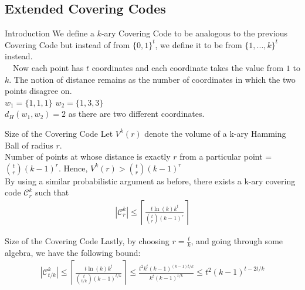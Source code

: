 \documentclass[pdf] {beamer}
\newcommand{\dist}[2]{d_H(#1,#2)}
\newcommand{\cc}{\mathcal{C}}
\begin{document}
	\subsection{Extended Covering Codes}
	\begin{frame}{Introduction}
	We define a $k$-ary Covering Code to be analogous to the previous Covering Code but instead of from $\{0,1\}^t$, we define it to be from $\{1,...,k\}^t$ instead. \\~\
	Now each point has $t$ coordinates and each coordinate takes the value from $1$ to $k$. The notion of distance remains as the number of coordinates in which the two points disagree on.\\
	$w_1 = \{1, 1, 1\}$ $w_2 = \{1, 3, 3\}$ \\
	$\dist{w_1}{w_2} = 2$ as there are two different coordinates.
	\end{frame}
	\begin{frame}{Size of the Covering Code}
	Let $V^k(r)$ denote the volume of a k-ary Hamming Ball of radius $r$. \\
	Number of points at whose distance is exactly $r$ from a particular point = $ {t \choose r}(k-1)^r$. Hence, $V^k(r) > {t \choose r}(k-1)^r$ \\
	By using a similar probabilistic argument as before, there exists a k-ary covering code $\cc_r^k$ such that 
	\begin{align*}
	|\cc^k_r| \leq \left \lceil \frac{t\ln(k)k^t}{{t \choose r}(k-1)^r} \right \rceil
	\end{align*}
	\end{frame}
	\begin{frame}{Size of the Covering Code}
	Lastly, by choosing $r = \frac{t}{k}$, and going through some algebra, we have the following bound:
	\begin{align*}
	|\cc^k_{{t/k}}| \leq \left \lceil \frac{t\ln(k)k^t}{{t \choose t/k}(k-1)^{t/k}} \right \rceil \leq \frac{t^2 k^t (k-1)^{(k-1)t/k}}{k^t(k-1)^{t/k}} \leq t^2(k-1)^{t-2t/k}
	\end{align*}
	\end{frame}
\end{document}
